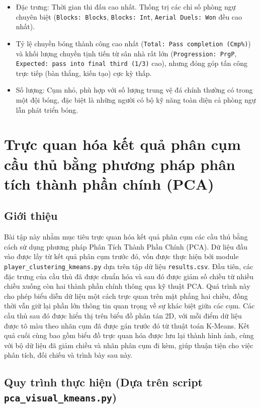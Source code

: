 \documentclass[12pt, a4paper]{report}
\begin{document}
\begin{itemize}
\begin{itemize}
        \item Đặc trưng: Thời gian thi đấu cao nhất. Thống trị các chỉ số phòng ngự chuyên biệt (\texttt{Blocks: Blocks}, \texttt{Blocks: Int}, \texttt{Aerial Duels: Won} đều cao nhất).
        \item Tỷ lệ chuyền bóng thành công cao nhất (\texttt{Total: Pass completion (Cmp\%)}) và khối lượng chuyền tịnh tiến từ sân nhà rất lớn (\texttt{Progression: PrgP}, \texttt{Expected: pass into final third (1/3)} cao), nhưng đóng góp tấn công trực tiếp (bàn thắng, kiến tạo) cực kỳ thấp.
        \item Số lượng: Cụm nhỏ, phù hợp với số lượng trung vệ đá chính thường có trong một đội bóng, đặc biệt là những người có bộ kỹ năng toàn diện cả phòng ngự lẫn phát triển bóng.
    \end{itemize}
\end{itemize}

\section{Trực quan hóa kết quả phân cụm cầu thủ bằng phương pháp phân tích thành phần chính (PCA)}

\subsection{Giới thiệu} 
Bài tập này nhằm mục tiêu trực quan hóa kết quả phân cụm các cầu thủ bằng cách sử dụng phương pháp Phân Tích Thành Phần Chính (PCA).
Dữ liệu đầu vào được lấy từ kết quả phân cụm trước đó, vốn được thực hiện bởi module \texttt{player\_clustering\_kmeans.py} dựa trên tập dữ liệu \texttt{results.csv}.
Đầu tiên, các đặc trưng của cầu thủ đã được chuẩn hóa và sau đó được giảm số chiều từ nhiều chiều xuống còn hai thành phần chính thông qua kỹ thuật PCA.
Quá trình này cho phép biểu diễn dữ liệu một cách trực quan trên mặt phẳng hai chiều, đồng thời vẫn giữ lại phần lớn thông tin quan trọng về sự khác biệt giữa các cụm.
Các cầu thủ sau đó được hiển thị trên biểu đồ phân tán 2D, với mỗi điểm dữ liệu được tô màu theo nhãn cụm đã được gán trước đó từ thuật toán K-Means.
Kết quả cuối cùng bao gồm biểu đồ trực quan hóa được lưu lại thành hình ảnh, cùng với bộ dữ liệu đã giảm chiều và nhãn phân cụm đi kèm, giúp thuận tiện cho việc phân tích, đối chiếu và trình bày sau này.

\subsection{Quy trình thực hiện \newline
(Dựa trên script \texttt{pca\_visual\_kmeans.py})} 
\end{document}

